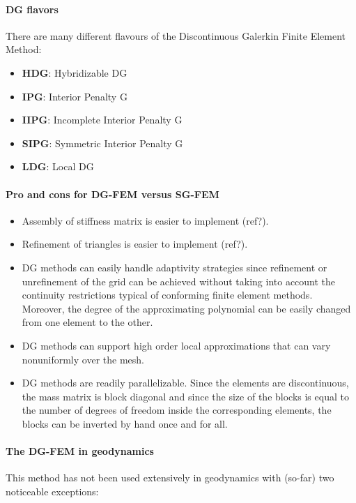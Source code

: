 \paragraph{DG flavors}
There are many different flavours of the Discontinuous Galerkin Finite Element Method:
\begin{itemize}
\item {\bf HDG}: Hybridizable DG \cite{cogo09,conp10,ngpc10,ngpc11,ngpe12}
\item {\bf IPG}: Interior Penalty G  \cite{mofh08,mofp10}
\item {\bf IIPG}: Incomplete Interior Penalty G  \cite{dole08}
\item {\bf SIPG}: Symmetric Interior Penalty G  \cite{bodi11,sclu17a}
\item {\bf LDG}: Local DG \cite{cacp02,coks02,cacs05,coks05}  
\end{itemize}

\paragraph{Pro and cons for DG-FEM versus SG-FEM}

\begin{itemize}
\item Assembly of stiffness matrix is easier to implement (ref?).
\item Refinement of triangles is easier to implement (ref?). 
\item DG methods can easily handle adaptivity strategies since refinement or
unrefinement of the grid can be achieved without taking into account
the continuity restrictions typical of conforming finite element methods. 
Moreover, the degree of the approximating polynomial can be easily
changed from one element to the other. \cite{coks00}
\item DG methods can support high order local approximations that can vary nonuniformly over the mesh.
\item DG methods are readily parallelizable. Since the elements are discontinuous, 
the mass matrix is block diagonal and since the size of the blocks
is equal to the number of degrees of freedom inside the corresponding
elements, the blocks can be inverted by hand once and for all.\cite{coks00}
\end{itemize}

\paragraph{The DG-FEM in geodynamics} 
This method has not been used extensively in geodynamics with (so-far) two 
noticeable exceptions:

